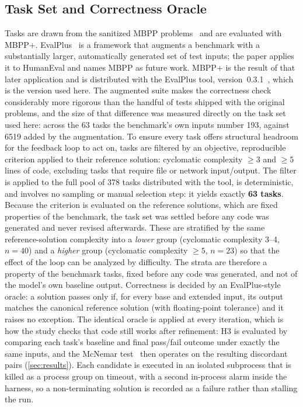 \subsection{Task Set and Correctness Oracle}
\label{sec:taskset}
Tasks are drawn from the sanitized MBPP problems~\citep{austin2021mbpp} and are
evaluated with MBPP+. EvalPlus~\citep{liu2023evalplus} is a framework that augments
a benchmark with a substantially larger, automatically generated set of test
inputs; the paper applies it to HumanEval and names MBPP as future work. MBPP+ is
the result of that later application and is distributed with the EvalPlus tool,
version~0.3.1~\citep{evalplus_tool}, which is the version used here. The augmented
suite makes the correctness check considerably more rigorous than the handful of
tests shipped with the original problems, and the size of that difference was
measured directly on the task set used here: across the 63 tasks the benchmark's
own inputs number 193, against 6519 added by the augmentation. To ensure every task offers
structural headroom for the feedback loop to act on, tasks are filtered by an
objective, reproducible criterion applied to their reference solution: cyclomatic
complexity $\geq 3$ and $\geq 5$ lines of code, excluding tasks that require file
or network input/output. The filter is applied to the full pool of 378 tasks
distributed with the tool, is deterministic, and involves no sampling or manual
selection step: it yields exactly \textbf{63 tasks}. Because the criterion is
evaluated on the reference solutions, which are fixed properties of the benchmark,
the task set was settled before any code was generated and never revised
afterwards. These are stratified by the same
reference-solution complexity into a \emph{lower} group (cyclomatic complexity
3--4, $n=40$) and a \emph{higher} group (cyclomatic complexity $\geq 5$, $n=23$) so
that the effect of the loop can be analyzed by difficulty. The strata are therefore
a property of the benchmark tasks, fixed before any code was generated, and not of
the model's own baseline output. Correctness is decided by an
EvalPlus-style oracle: a solution passes only if, for every base and extended
input, its output matches the canonical reference solution (with floating-point
tolerance) and it raises no exception. The identical oracle is applied at every
iteration, which is how the study checks that code still works after
refinement: H3 is evaluated by comparing each task's baseline and final pass/fail
outcome under exactly the same inputs, and the McNemar
test~\citep{mcnemar1947} then operates on the
resulting discordant pairs (\cref{sec:results}). Each candidate is executed in an
isolated subprocess that is killed as a process group on timeout, with a second
in-process alarm inside the harness, so a non-terminating solution is recorded as a
failure rather than stalling the run.

